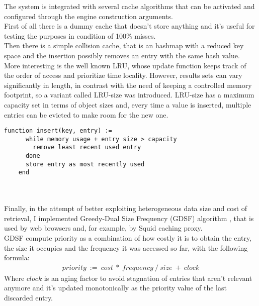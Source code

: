The system is integrated with several cache algorithms that can be activated and configured through the engine construction arguments.\\
First of all there is a dummy cache that doesn't store anything and it's useful for testing the purposes in condition of 100\% misses.\\
Then there is a simple collision cache, that is an hashmap with a reduced key space and the insertion possibly removes an entry with the same hash value.\\
More interesting is the well known LRU, whose update function keeps track of the order of access and prioritize time locality. However, results sets can vary significantly in length, in contrast with the need of keeping a controlled memory footprint, so a variant called LRU-size was introduced. LRU-size has a maximum capacity set in terms of object sizes and, every time a value is inserted, multiple entries can be evicted to make room for the new one.\\
\begin{minipage}{\textwidth}
\begin{lstlisting}[caption={LRU-size insertion},label={lst:lrusize}]
    function insert(key, entry) :=
      while memory usage + entry size > capacity
        remove least recent used entry
      done
      store entry as most recently used
    end
\end{lstlisting}
\end{minipage}\\
\\
Finally, in the attempt of better exploiting heterogeneous data size and cost of retrieval, I implemented Greedy-Dual Size Frequency (GDSF) algorithm \cite{gdsf}, that is used by web browsers and, for example, by Squid caching proxy.\\
GDSF compute priority as a combination of how costly it is to obtain the entry, the size it occupies and the frequency it was accessed so far, with the following formula:
\begin{align*}
priority\ :=\ cost\ *\ frequency\ /\ size\ +\ clock
\end{align*}
Where $clock$ is an aging factor to avoid stagnation of entries that aren't relevant anymore and it's updated monotonically as the priority value of the last discarded entry.
